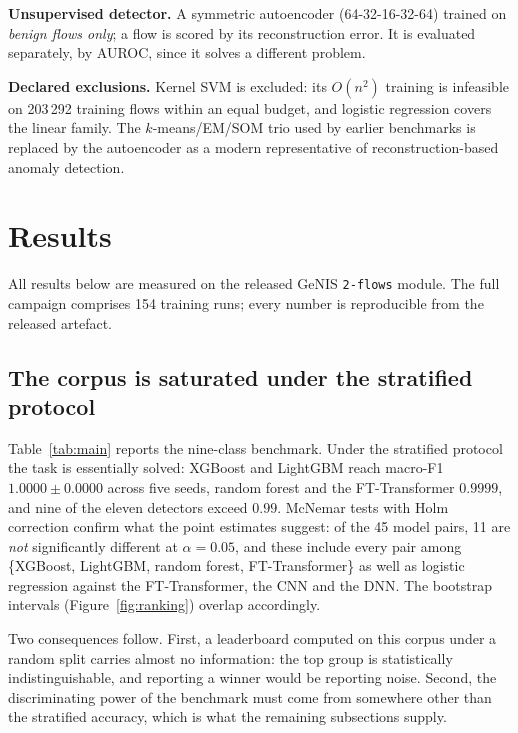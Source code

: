 \documentclass[review,12pt]{elsarticle}
\begin{document}
\textbf{Unsupervised detector.} A symmetric autoencoder (64-32-16-32-64) trained on
\emph{benign flows only}; a flow is scored by its reconstruction error. It is evaluated
separately, by AUROC, since it solves a different problem.

\textbf{Declared exclusions.} Kernel SVM is excluded: its $O(n^2)$ training is
infeasible on 203\,292 training flows within an equal budget, and logistic regression
covers the linear family. The $k$-means/EM/SOM trio used by earlier benchmarks
\cite{maseer2021benchmarking} is replaced by the autoencoder as a modern representative
of reconstruction-based anomaly detection.

\section{Results}
\label{sec:results}

All results below are measured on the released GeNIS \texttt{2-flows} module. The full
campaign comprises 154 training runs; every number is reproducible from the released
artefact.

\subsection{The corpus is saturated under the stratified protocol}
\label{sec:saturation}
Table~\ref{tab:main} reports the nine-class benchmark. Under the stratified protocol the
task is essentially solved: XGBoost and LightGBM reach macro-F1 $1.0000 \pm 0.0000$
across five seeds, random forest and the FT-Transformer $0.9999$, and nine of the eleven
detectors exceed $0.99$. McNemar tests with Holm correction confirm what the point
estimates suggest: of the 45 model pairs, 11 are \emph{not} significantly different at
$\alpha = 0.05$, and these include every pair among
\{XGBoost, LightGBM, random forest, FT-Transformer\} as well as logistic regression
against the FT-Transformer, the CNN and the DNN. The bootstrap intervals
(Figure~\ref{fig:ranking}) overlap accordingly.

Two consequences follow. First, a leaderboard computed on this corpus under a random
split carries almost no information: the top group is statistically indistinguishable, and
reporting a winner would be reporting noise. Second, the discriminating power of the
benchmark must come from somewhere other than the stratified accuracy, which is what
the remaining subsections supply.
\end{document}
